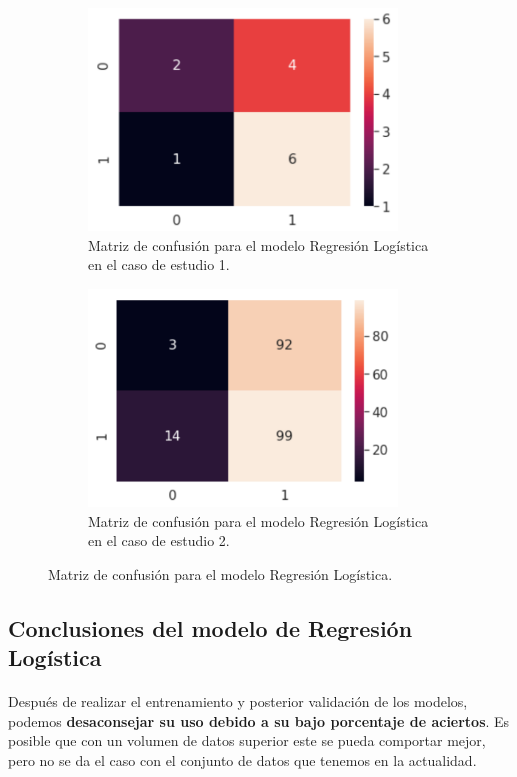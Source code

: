 \begin{figure}[!htb]
    \begin{subfigure}[b]{0.45\linewidth}
    	\centering
    	\includegraphics[width=0.9\textwidth]{images/resultados_lr_cm_conjunto1.png}
		\caption{Matriz de confusión para el modelo Regresión Logística en el caso de estudio 1.}
		\label{lrCMCase1}
	\end{subfigure}
	\begin{subfigure}[b]{0.45\linewidth} 
		\centering
	    \includegraphics[width=0.9\textwidth]{images/resultados_lr_cm_conjunto2.png}
		\caption{Matriz de confusión para el modelo Regresión Logística en el caso de estudio 2.}
	  \label{lrCMCase2}
	\end{subfigure}
	\caption{Matriz de confusión para el modelo Regresión Logística.}
	\label{lrcm}
\end{figure}

\subsection{Conclusiones del modelo de Regresión Logística}
\label{resultados:lr_conclusiones}

\paragraph{}
Después de realizar el entrenamiento y posterior validación de los modelos, podemos \textbf{desaconsejar su uso debido a su bajo porcentaje de aciertos}. Es posible que con un volumen de datos superior este se pueda comportar mejor, pero no se da el caso con el conjunto de datos que tenemos en la actualidad.

